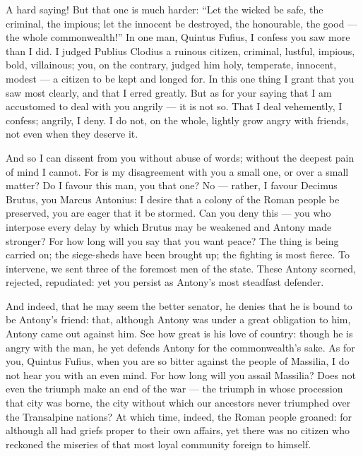  A hard saying! But that one is much harder: ``Let the wicked be safe, the criminal, the impious; let the innocent be destroyed, the honourable, the good --- the whole commonwealth!'' In one man, Quintus Fufius, I confess you saw more than I did. I judged Publius Clodius a ruinous citizen, criminal, lustful, impious, bold, villainous; you, on the contrary, judged him holy, temperate, innocent, modest --- a citizen to be kept and longed for. In this one thing I grant that you saw most clearly, and that I erred greatly. But as for your saying that I am accustomed to deal with you angrily --- it is not so. That I deal vehemently, I confess; angrily, I deny. I do not, on the whole, lightly grow angry with friends, not even when they deserve it.

 And so I can dissent from you without abuse of words; without the deepest pain of mind I cannot. For is my disagreement with you a small one, or over a small matter? Do I favour this man, you that one? No --- rather, I favour Decimus Brutus, you Marcus Antonius: I desire that a colony of the Roman people be preserved, you are eager that it be stormed. Can you deny this --- you who interpose every delay by which Brutus may be weakened and Antony made stronger? For how long will you say that you want peace? The thing is being carried on; the siege-sheds have been brought up; the fighting is most fierce. To intervene, we sent three of the foremost men of the state. These Antony scorned, rejected, repudiated: yet you persist as Antony's most steadfast defender.

 And indeed, that he may seem the better senator, he denies that he is bound to be Antony's friend: that, although Antony was under a great obligation to him, Antony came out against him. See how great is his love of country: though he is angry with the man, he yet defends Antony for the commonwealth's sake. As for you, Quintus Fufius, when you are so bitter against the people of Massilia, I do not hear you with an even mind. For how long will you assail Massilia? Does not even the triumph make an end of the war --- the triumph in whose procession that city was borne, the city without which our ancestors never triumphed over the Transalpine nations? At which time, indeed, the Roman people groaned: for although all had griefs proper to their own affairs, yet there was no citizen who reckoned the miseries of that most loyal community foreign to himself.

